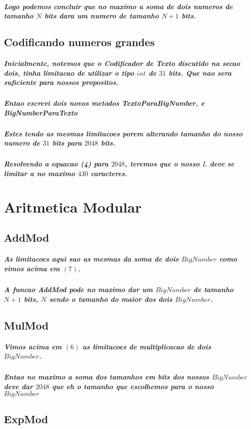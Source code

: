 \documentclass[12pt,twoside, a4paper, twocolumn]{article}
\begin{document}
\subparagraph*{Logo podemos concluir que no maximo a soma de dois numeros de tamanho $N$ bits dara um numero de tamanho $N+1$ bits.}

\subsection{Codificando numeros grandes}

\subparagraph*{Inicialmente, notemos que o \emph{Codificador de Texto} discutido na secao dois, tinha limitacao de utilizar o tipo $int$ de $31$ bits. Que nao sera suficiente para nossos propositos. }

\subparagraph*{Entao escrevi dois novos metodos \emph{TextoParaBigNumber}, e \emph{BigNumberParaTexto} }

\subparagraph*{Estes tendo as mesmas limitacoes porem alterando tamanho do nosso numero de $31$ bits para $2048$ bits.}

\subparagraph*{Resolvendo a equacao (4) para $2048$, teremos que o nosso $L$ deve se limitar a no maximo $430$ caracteres.}

\section{Aritmetica Modular}

\subsection{AddMod}

\subparagraph*{As limitacoes aqui sao as mesmas da soma de dois $BigNumber$ como vimos acima em $(7)$. }
\subparagraph*{A funcao AddMod pode no maximo dar um $BigNumber$ de tamanho $N+1$ bits, $N$ sendo o tamanho do maior dos dois $BigNumber$.}

\subsection{MulMod}

\subparagraph*{Vimos acima em $(6)$ as limitacoes de multiplicacao de dois $BigNumber$.}

\subparagraph*{Entao no maximo a soma dos tamanhos em bits dos nossos $BigNumber$ deve dar $2048$ que eh o tamanho que escolhemos para o nosso $BigNumber$}

\subsection{ExpMod}
\end{document}
